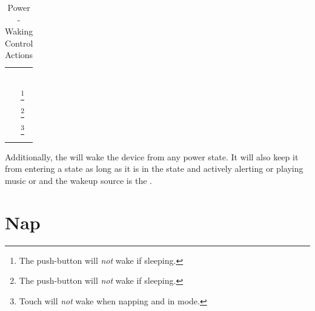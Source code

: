 
\par\medskip


\begin{longtabu} { X[1,c,m] | X[2,c,m] }
  \thrule
   &  \\ \mrule

    & \hyperref[Operation - Selector Dial]{} \\
    & \hyperref[Operation - Settings Knob]{} \\
    & \hyperref[Brightness Knob]{} \\ 

    & \hyperref[Operation - Settings Knob]{} \\
    & \hyperref[Audio - Play|Pause|Stop]{} \\
    & \hyperref[Audio - Next]{}\footnote{ The  push-button
      will \textit{not} wake if sleeping.} \\
    & \hyperref[Audio - Previous]{}\footnote{ The  push-button
      will \textit{not} wake if sleeping.} \\ 

   & \hyperref[Operation - Touch Sensor]{}\footnote{ Touch
    will \textit{not} wake when napping and in  mode.} \\

  \bhrule
\caption{Power - Waking Control Actions}
\end{longtabu}

Additionally, the  will wake the device from any power state. It will
also keep it from entering a  state as long as it is in the 
state and actively alerting or playing music or  and the wakeup source
is the .

\section{Nap} \label{Power - Nap} 

